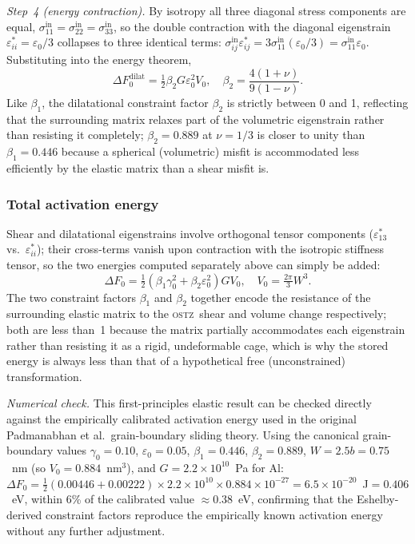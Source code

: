 \documentclass[5p,sort&compress]{elsarticle}
\newcommand{\OSTZ}{\textsc{ostz}}
\newcommand{\dF}{\Delta F_0}
\newcommand{\gz}{\gamma_0}
\newcommand{\half}{\tfrac{1}{2}}
\begin{document}
\textit{Step~4 (energy contraction).}
By isotropy all three diagonal stress components are equal,
$\sigma_{11}^\mathrm{in}=\sigma_{22}^\mathrm{in}=\sigma_{33}^\mathrm{in}$,
so the double contraction with the diagonal eigenstrain
$\varepsilon^*_{ii}=\varepsilon_0/3$ collapses to three identical
terms: $\sigma_{ij}^\mathrm{in}\varepsilon^*_{ij}
=3\sigma_{11}^\mathrm{in}(\varepsilon_0/3)=\sigma_{11}^\mathrm{in}\varepsilon_0$.
Substituting into the energy theorem,
\begin{equation}
  \boxed{\dF^\text{dilat}=\half\beta_2 G\varepsilon_0^2 V_0,\quad
  \beta_2=\frac{4(1+\nu)}{9(1-\nu)}.}
  \label{eq:Edilat}
\end{equation}
Like $\beta_1$, the dilatational constraint factor $\beta_2$ is
strictly between 0 and 1, reflecting that the surrounding matrix
relaxes part of the volumetric eigenstrain rather than resisting it
completely; $\beta_2=0.889$ at $\nu=1/3$ is closer to unity than
$\beta_1=0.446$ because a spherical (volumetric) misfit is
accommodated less efficiently by the elastic matrix than a shear
misfit is.

\subsubsection{Total activation energy}

Shear and dilatational eigenstrains involve orthogonal tensor
components ($\varepsilon^*_{13}$ vs.\ $\varepsilon^*_{ii}$);
their cross-terms vanish upon contraction with the isotropic stiffness
tensor, so the two energies computed separately above can simply be
added:
\begin{equation}
  \boxed{\dF=\half(\beta_1\gz^2+\beta_2\varepsilon_0^2)GV_0,\quad
  V_0=\tfrac{2\pi}{3}W^3.}
  \label{eq:dF0}
\end{equation}
The two constraint factors $\beta_1$ and $\beta_2$ together encode
the resistance of the surrounding elastic matrix to the \OSTZ\ shear
and volume change respectively; both are less than~1 because the
matrix partially accommodates each eigenstrain rather than resisting
it as a rigid, undeformable cage, which is why the stored energy is
always less than that of a hypothetical free (unconstrained)
transformation.

\textit{Numerical check.} This first-principles elastic result can
be checked directly against the empirically calibrated activation
energy used in the original Padmanabhan et al.\ grain-boundary
sliding theory. Using the canonical grain-boundary values
$\gz=0.10$, $\varepsilon_0=0.05$, $\beta_1=0.446$, $\beta_2=0.889$,
$W=2.5b=0.75$~nm (so $V_0=0.884$~nm$^3$), and $G=2.2\times10^{10}$~Pa
for Al:
$\dF=\half(0.00446+0.00222)\times2.2\times10^{10}\times0.884\times10^{-27}
=6.5\times10^{-20}$~J$=0.406$~eV, within 6\% of the calibrated value
$\approx0.38$~eV, confirming that the Eshelby-derived constraint
factors reproduce the empirically known activation energy without
any further adjustment.
\end{document}
